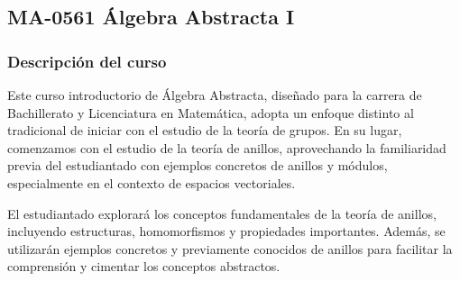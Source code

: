 \newpage
\subsection*{MA-0561 Álgebra Abstracta I}

\hypertarget{MA0561}{}
\begin{refsection}
\begin{table}[H]
\end{table}



\subsubsection*{Descripción del curso}

Este curso introductorio de Álgebra Abstracta, diseñado para la carrera de Bachillerato y Licenciatura en Matemática, adopta un enfoque distinto al tradicional de iniciar con el estudio de la teoría de grupos. En su lugar, comenzamos con el estudio de la teoría de anillos, aprovechando la familiaridad previa del estudiantado con ejemplos concretos de anillos y módulos, especialmente en el contexto de espacios vectoriales.

El estudiantado explorará los conceptos fundamentales de la teoría de anillos, incluyendo estructuras, homomorfismos y propiedades importantes. Además, se utilizarán ejemplos concretos y previamente conocidos de anillos para facilitar la comprensión y cimentar los conceptos abstractos. 


\end{refsection}
